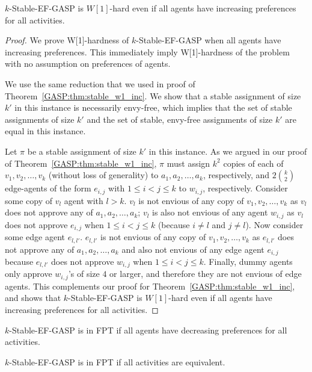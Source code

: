 \begin{theorem} \label{GASP:thm:stable_ef_gasp_w1}
$k$-Stable-EF-GASP is $W[1]$-hard even if all agents have increasing preferences for all activities.
\end{theorem}
\begin{proof}
	We prove W[1]-hardness of $k$-Stable-EF-GASP when all agents have increasing preferences. This immediately imply W[1]-hardness of the problem with no assumption on preferences of agents.
	
	We use the same reduction that we used in proof of Theorem~\ref{GASP:thm:stable_w1_inc}. We show that a stable assignment of size $k'$ in this instance is necessarily envy-free, which implies that the set of stable assignments of size $k'$ and the set of stable, envy-free assignments of size $k'$ are equal in this instance. 

	Let $\pi$ be a stable assignment of size $k'$ in this instance.
	As we argued in our proof of Theorem~\ref{GASP:thm:stable_w1_inc}, $\pi$ must assign $k^2$ copies of each of $v_1, v_2, \dots, v_k$ (without loss of generality) to $a_1, a_2, \dots, a_k$, respectively, and $2\binom{k}{2}$ edge-agents of the form $e_{i,j}$ with $1\leq i < j \leq k$ to $w_{i,j}$, respectively. Consider some copy of $v_l$ agent with $l > k$. $v_l$ is not envious of any copy of $v_1, v_2, \dots, v_k$ as $v_l$ does not approve any of $a_1, a_2, \dots, a_k$; $v_l$ is also not envious of any agent $w_{i,j}$ as $v_l$ does not approve $e_{i,j}$ when $1 \leq i < j \leq k$ (because $i\neq l$ and $j\neq l$). Now consider some edge agent $e_{l, l'}$. $e_{l, l'}$ is not envious of any copy of $v_1, v_2, \dots, v_k$ as $e_{l, l'}$ does not approve any of $a_1, a_2, \dots, a_k$ and also not envious of any edge agent $e_{i,j}$ because $e_{l, l'}$ does not approve $w_{i,j}$ when $1 \leq i < j \leq k$. Finally, dummy agents only approve $w_{i,j}$'s of size $4$ or larger, and therefore they are not envious of edge agents. This complements our proof for Theorem~\ref{GASP:thm:stable_w1_inc}, and shows that $k$-Stable-EF-GASP is $W[1]$-hard even if all agents have increasing preferences for all activities. 
\end{proof}


\begin{theorem} \label{GASP:thm:stable_ef_dec_fpt}
$k$-Stable-EF-GASP is in FPT if all agents have decreasing preferences for all activities. 
\end{theorem} %

\begin{theorem} \label{GASP:thm:stable_ef_equiv_fpt}
$k$-Stable-EF-GASP is in FPT if all activities are equivalent.
\end{theorem} %


